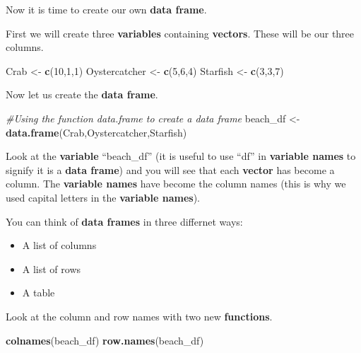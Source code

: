 \documentclass[]{book}
\newenvironment{Shaded}{\begin{snugshade}}{\end{snugshade}}
\newcommand{\KeywordTok}[1]{\textcolor[rgb]{0.13,0.29,0.53}{\textbf{#1}}}
\newcommand{\DecValTok}[1]{\textcolor[rgb]{0.00,0.00,0.81}{#1}}
\newcommand{\StringTok}[1]{\textcolor[rgb]{0.31,0.60,0.02}{#1}}
\newcommand{\CommentTok}[1]{\textcolor[rgb]{0.56,0.35,0.01}{\textit{#1}}}
\newcommand{\NormalTok}[1]{#1}
\providecommand{\tightlist}{%
  \setlength{\itemsep}{0pt}\setlength{\parskip}{0pt}}
\begin{document}
Now it is time to create our own \textbf{data frame}.

First we will create three \textbf{variables} containing
\textbf{vectors}. These will be our three columns.

\begin{Shaded}
\begin{Highlighting}[]
\NormalTok{Crab <-}\StringTok{ }\KeywordTok{c}\NormalTok{(}\DecValTok{10}\NormalTok{,}\DecValTok{1}\NormalTok{,}\DecValTok{1}\NormalTok{)}
\NormalTok{Oystercatcher <-}\StringTok{ }\KeywordTok{c}\NormalTok{(}\DecValTok{5}\NormalTok{,}\DecValTok{6}\NormalTok{,}\DecValTok{4}\NormalTok{)}
\NormalTok{Starfish <-}\StringTok{ }\KeywordTok{c}\NormalTok{(}\DecValTok{3}\NormalTok{,}\DecValTok{3}\NormalTok{,}\DecValTok{7}\NormalTok{)}
\end{Highlighting}
\end{Shaded}

Now let us create the \textbf{data frame}.

\begin{Shaded}
\begin{Highlighting}[]
\CommentTok{#Using the function data.frame to create a data frame}
\NormalTok{beach_df <-}\StringTok{ }\KeywordTok{data.frame}\NormalTok{(Crab,Oystercatcher,Starfish)}
\end{Highlighting}
\end{Shaded}

Look at the \textbf{variable} ``beach\_df'' (it is useful to use ``df''
in \textbf{variable names} to signify it is a \textbf{data frame}) and
you will see that each \textbf{vector} has become a column. The
\textbf{variable names} have become the column names (this is why we
used capital letters in the \textbf{variable names}).

You can think of \textbf{data frames} in three differnet ways:

\begin{itemize}
\tightlist
\item
  A list of columns
\item
  A list of rows
\item
  A table
\end{itemize}

Look at the column and row names with two new \textbf{functions}.

\begin{Shaded}
\begin{Highlighting}[]
\KeywordTok{colnames}\NormalTok{(beach_df)}
\KeywordTok{row.names}\NormalTok{(beach_df)}
\end{Highlighting}
\end{Shaded}
\end{document}
